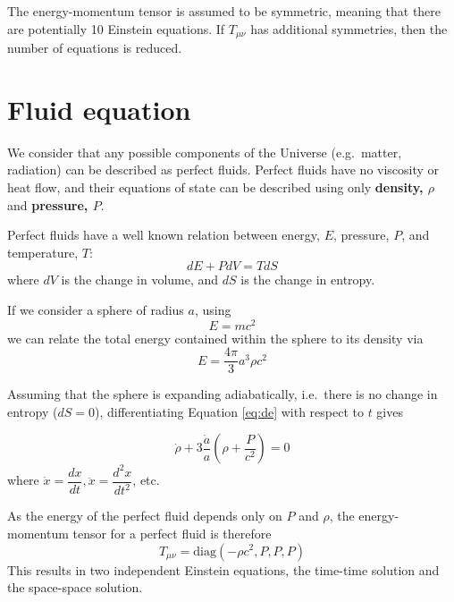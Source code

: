 \documentclass[]{book}
\begin{document}
The energy-momentum tensor is assumed to be symmetric, meaning that
there are potentially 10 Einstein equations. If \(T_{\mu\nu}\) has
additional symmetries, then the number of equations is reduced.

\hypertarget{sec:fluid_eqns}{%
\section{Fluid equation}\label{sec:fluid_eqns}}

We consider that any possible components of the Universe (e.g.~matter,
radiation) can be described as perfect fluids. Perfect fluids have no
viscosity or heat flow, and their equations of state can be described
using only \textbf{density, \(\rho\)} and \textbf{pressure, \(P\)}.

Perfect fluids have a well known relation between energy, \(E\), pressure,
\(P\), and temperature, \(T\):
\begin{equation}
dE + PdV = TdS
\label{eq:de}
\end{equation}
where \(dV\) is the change in volume, and \(dS\) is the
change in entropy.

If we consider a sphere of radius \(a\), using
\begin{equation}
E = mc^2
\label{eq:emc2}
\end{equation}
we can relate
the total energy contained within the sphere to its density via
\begin{equation}
E = \dfrac{4\pi}{3}a^3\rho c^2
\label{eq:e-rho}
\end{equation}

Assuming that the sphere is expanding adiabatically, i.e.~there is no
change in entropy (\(dS = 0\)), differentiating
Equation \eqref{eq:de}
with respect to \(t\) gives

\begin{equation}
    \dot{\rho} + 3\dfrac{\dot{a}}{a}\left(\rho + \dfrac{P}{c^2}\right) = 0
\label{eq:fluid}
\end{equation}
where \(\dot{x} = \dfrac{dx}{dt}, \ddot{x} = \dfrac{d^2x}{dt^2}\), etc.

As the energy of the perfect fluid depends only on \(P\) and \(\rho\), the
energy-momentum tensor for a perfect fluid is therefore
\begin{equation}
T_{\mu\nu} = \text{diag}\left(-\rho c^2, P, P, P\right)
\label{eq:per-fluid}
\end{equation}
This results
in two independent Einstein equations, the time-time solution and the
space-space solution.
\end{document}
